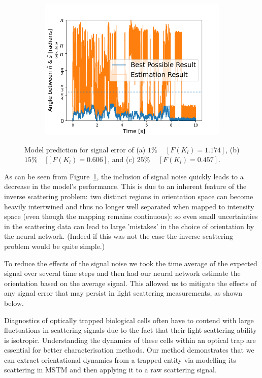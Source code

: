 \documentclass[final,  3p]{elsarticle}
\begin{document}
\begin{figure}[h]
\begin{subfigure}{0.32\textwidth}
		\includegraphics[width=\textwidth]{./Images/fig6c.png}
	\end{subfigure}
	\caption{Model prediction for signal error of (a) $1\%$ ~  $[F(K_l)=1.174]$, (b) $15\%$ ~ [$[F(K_l)=0.606]$, and (c) $25\%$ ~  $[F(K_l)=0.457]$.}
	\label{fig:epsilon}
\end{figure}

As can be seen from Figure~\ref{fig:epsilon}, the inclusion of signal noise quickly leads to a decrease in the model's performance. This is due to an inherent feature of the inverse scattering problem: two distinct regions in orientation space can become heavily intertwined and thus no longer well separated when mapped to intensity space (even though the mapping remains  continuous): so even small uncertainties in the scattering data can lead to large 'mistakes' in the choice of orientation by the neural network. (Indeed if this was not the case the inverse scattering problem would be quite simple.) 

To reduce the effects of the signal noise we took the time average of the expected signal over several time steps and then had our neural network estimate the orientation based on the average signal. This allowed us to mitigate the effects of any signal error that may persist in light scattering measurements, as shown below.

Diagnostics of optically trapped biological cells often have to contend with large fluctuations in scattering signals due to the fact that their light scattering ability is isotropic. Understanding the dynamics of these cells within an optical trap are essential for better characterisation methods. Our method demonstrates that we can extract orientational dynamics from a trapped entity via modelling its scattering in MSTM and then applying it to a raw scattering signal. 
\end{document}
